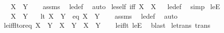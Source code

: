 \begin{isabellebody}
\ \ \ {\isachardoublequoteopen}X\ {\isasymle}\ Y{\isachardoublequoteclose}\isanewline
%
\isadelimproof
\ \ %
\endisadelimproof
%
\isatagproof
{}\isamarkupfalse%
\ assms\ \isamarkupfalse%
\ le{\isacharunderscore}{\kern0pt}def\ \isamarkupfalse%
\ auto%
\endisatagproof
{\isafoldproof}%
%
\isadelimproof
\isanewline
%
\endisadelimproof
\isanewline
{}\isamarkupfalse%
\ le{\isacharunderscore}{\kern0pt}self\ {\isacharbrackleft}{\kern0pt}iff{\isacharbrackright}{\kern0pt}{\isacharcolon}{\kern0pt}\ {\isachardoublequoteopen}X\ {\isasymle}\ X{\isachardoublequoteclose}%
\isadelimproof
\ %
\endisadelimproof
%
\isatagproof
{}\isamarkupfalse%
\ le{\isacharunderscore}{\kern0pt}def\ \isamarkupfalse%
\ simp%
\endisatagproof
{\isafoldproof}%
%
\isadelimproof
%
\endisadelimproof
\isanewline
\isanewline
{}\isamarkupfalse%
\ leE{\isacharcolon}{\kern0pt}\isanewline
\ \ \ {\isachardoublequoteopen}X\ {\isasymle}\ Y{\isachardoublequoteclose}\isanewline
\ \ \ {\isacharparenleft}{\kern0pt}lt{\isacharparenright}{\kern0pt}\ {\isachardoublequoteopen}X\ {\isacharless}{\kern0pt}\ Y{\isachardoublequoteclose}\ {\isacharbar}{\kern0pt}\ {\isacharparenleft}{\kern0pt}eq{\isacharparenright}{\kern0pt}\ {\isachardoublequoteopen}X\ {\isacharequal}{\kern0pt}\ Y{\isachardoublequoteclose}\isanewline
%
\isadelimproof
\ \ %
\endisadelimproof
%
\isatagproof
{}\isamarkupfalse%
\ assms\ \isamarkupfalse%
\ le{\isacharunderscore}{\kern0pt}def\ \isamarkupfalse%
\ auto%
\endisatagproof
{\isafoldproof}%
%
\isadelimproof
\isanewline
%
\endisadelimproof
\isanewline
{}\isamarkupfalse%
\ le{\isacharunderscore}{\kern0pt}iff{\isacharunderscore}{\kern0pt}lt{\isacharunderscore}{\kern0pt}or{\isacharunderscore}{\kern0pt}eq{\isacharcolon}{\kern0pt}\ {\isachardoublequoteopen}X\ {\isasymle}\ Y\ {\isasymlongleftrightarrow}\ X\ {\isacharless}{\kern0pt}\ Y\ {\isasymor}\ X\ {\isacharequal}{\kern0pt}\ Y{\isachardoublequoteclose}\isanewline
%
\isadelimproof
\ \ %
\endisadelimproof
%
\isatagproof
{}\isamarkupfalse%
\ le{\isacharunderscore}{\kern0pt}if{\isacharunderscore}{\kern0pt}lt\ leE\ \isamarkupfalse%
\ blast%
\endisatagproof
{\isafoldproof}%
%
\isadelimproof
\isanewline
%
\endisadelimproof
\isanewline
{}\isamarkupfalse%
\ le{\isacharunderscore}{\kern0pt}trans\ {\isacharbrackleft}{\kern0pt}trans{\isacharbrackright}{\kern0pt}{\isacharcolon}{\kern0pt}\isanewline

\end{isabellebody}
